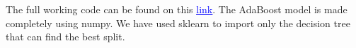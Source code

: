 \documentclass{homework}
\begin{document}
\section{}
The full working code can be found on this \href{https://github.com/Anshul-Sangrame/Handouts-2022-2023/blob/main/Boosting%20and%20bagging/code/main.ipynb}{\textcolor{blue}{\underline{link}}}. The AdaBoost model is made completely using numpy. We have used sklearn to import only the decision tree that can find the best split.

\end{document}
